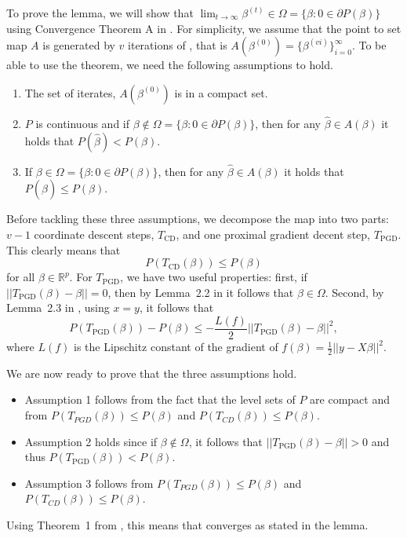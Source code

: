 To prove the lemma, we will show that $\lim_{t \rightarrow \infty} \beta^{(t)} \in \Omega = \{\beta:0 \in \partial P(\beta)\}$ using Convergence Theorem A in \textcite[p.~91]{zangwill1969}.
For simplicity, we assume that the point to set map $A$ is generated by $v$ iterations of , that is $A(\beta^{(0)})= \{\beta^{(vi)}\}_{i=0}^\infty$.
To be able to use the theorem, we need the following assumptions to hold.
\begin{enumerate}
	\item The set of iterates, $A(\beta^{(0)})$ is in a compact set.
	\item $P$ is continuous and if $\beta \notin \Omega = \{\beta:0 \in \partial P(\beta)\}$, then for any $\hat{\beta} \in A(\beta)$  it holds that $P(\hat{\beta}) < P(\beta)$.
	\item If $\beta  \in \Omega =\{\beta:0 \in \partial P(\beta)\}$, then for any $\hat{\beta}\in A(\beta)$ it holds that $P(\hat{\beta}) \leq P(\beta)$.
\end{enumerate}

Before tackling these three assumptions, we decompose the map into two parts: $v-1$ coordinate descent steps, $T_\text{CD}$, and one proximal gradient decent step, $T_{\text{PGD}}$.
This clearly means that
$$
	P(T_\text{CD}(\beta)) \leq P(\beta)
$$
for all $\beta \in \mathbb{R}^p$.
For $T_\text{PGD}$, we have two useful properties: first, if $||T_\text{PGD}(\beta) - \beta||=0$, then by Lemma~2.2 in \textcite{beck2009} it follows that $\beta \in \Omega$.
Second, by Lemma~2.3 in \textcite{beck2009}, using $x=y$, it follows that
$$
	P(T_\text{PGD}(\beta)) - P(\beta) \leq  - \frac{L(f)}{2}||T_\text{PGD}(\beta) - \beta||^2,
$$
where $L(f)$ is the Lipschitz constant of the gradient of $f(\beta)= \frac{1}{2}||y-X\beta||^2$.

We are now ready to prove that the three assumptions hold.
\begin{itemize}
	\item Assumption 1 follows from the fact that the level sets of $P$ are compact and from $P(T_{PGD}(\beta)) \leq P(\beta)$ and $P(T_{CD}(\beta)) \leq P(\beta)$.
	\item Assumption 2 holds since if $\beta \notin \Omega$, it follows that $||T_\text{PGD}(\beta) - \beta|| > 0$ and thus $P(T_\text{PGD}(\beta)) < P(\beta)$.
	\item Assumption 3 follows  from $P(T_{PGD}(\beta)) \leq P(\beta)$ and $P(T_{CD}(\beta)) \leq P(\beta)$.
\end{itemize}
Using Theorem~1 from \textcite{zangwill1969}, this means that  converges as stated in the lemma.


